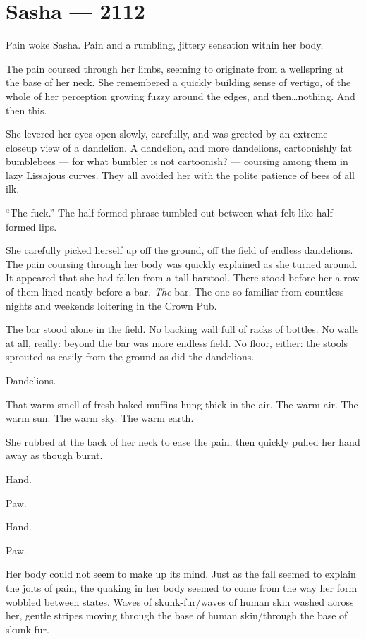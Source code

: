 \hypertarget{sasha-2112}{%
\chapter*{Sasha — 2112}\label{sasha-2112}}

Pain woke Sasha. Pain and a rumbling, jittery sensation within her body.

The pain coursed through her limbs, seeming to originate from a wellspring at the base of her neck. She remembered a quickly building sense of vertigo, of the whole of her perception growing fuzzy around the edges, and then\ldots{}nothing. And then this.

She levered her eyes open slowly, carefully, and was greeted by an extreme closeup view of a dandelion. A dandelion, and more dandelions, cartoonishly fat bumblebees — for what bumbler is not cartoonish? — coursing among them in lazy Lissajous curves. They all avoided her with the polite patience of bees of all ilk.

``The fuck.'' The half-formed phrase tumbled out between what felt like half-formed lips.

She carefully picked herself up off the ground, off the field of endless dandelions. The pain coursing through her body was quickly explained as she turned around. It appeared that she had fallen from a tall barstool. There stood before her a row of them lined neatly before a bar. \emph{The} bar. The one so familiar from countless nights and weekends loitering in the Crown Pub.

The bar stood alone in the field. No backing wall full of racks of bottles. No walls at all, really: beyond the bar was more endless field. No floor, either: the stools sprouted as easily from the ground as did the dandelions.

Dandelions.

That warm smell of fresh-baked muffins hung thick in the air. The warm air. The warm sun. The warm sky. The warm earth.

She rubbed at the back of her neck to ease the pain, then quickly pulled her hand away as though burnt.

Hand.

Paw.

Hand.

Paw.

Her body could not seem to make up its mind. Just as the fall seemed to explain the jolts of pain, the quaking in her body seemed to come from the way her form wobbled between states. Waves of skunk-fur/waves of human skin washed across her, gentle stripes moving through the base of human skin/through the base of skunk fur.

